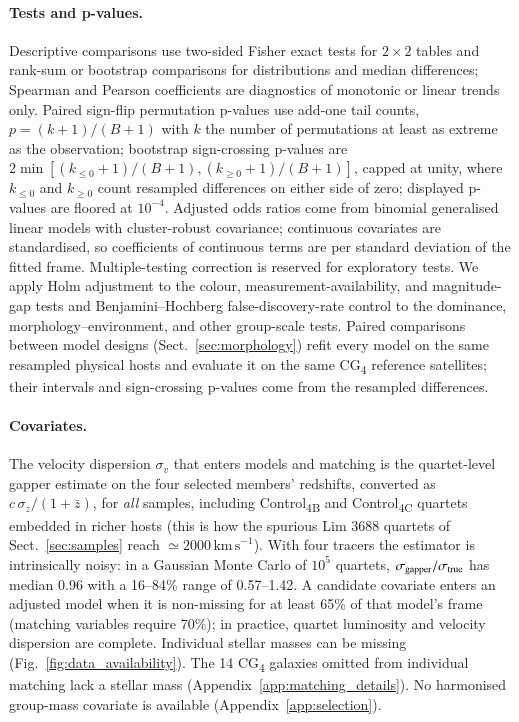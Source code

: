 \documentclass{aa}
\newcommand{\CB}{Control\textsubscript{4B}}
\newcommand{\CC}{Control\textsubscript{4C}}
\newcommand{\CG}{CG\textsubscript{4}}
\newcommand{\kms}{\,\mathrm{km\,s}^{-1}}
\begin{document}
\begin{appendix}
\paragraph{Tests and p-values.} Descriptive comparisons use two-sided Fisher exact tests for \(2\times2\) tables and rank-sum or bootstrap comparisons for distributions and median differences; Spearman and Pearson coefficients are diagnostics of monotonic or linear trends only. Paired sign-flip permutation p-values use add-one tail counts, \(p = (k+1)/(B+1)\) with \(k\) the number of permutations at least as extreme as the observation; bootstrap sign-crossing p-values are \(2\min[(k_{\le 0}+1)/(B+1),(k_{\ge 0}+1)/(B+1)]\), capped at unity, where \(k_{\le 0}\) and \(k_{\ge 0}\) count resampled differences on either side of zero; displayed p-values are floored at \(10^{-4}\). Adjusted odds ratios come from binomial generalised linear models with cluster-robust covariance; continuous covariates are standardised, so coefficients of continuous terms are per standard deviation of the fitted frame. Multiple-testing correction is reserved for exploratory tests. We apply Holm adjustment \citep{Holm1979} to the colour, measurement-availability, and magnitude-gap tests and Benjamini--Hochberg false-discovery-rate control \citep{BenjaminiHochberg1995} to the dominance, morphology--environment, and other group-scale tests. Paired comparisons between model designs (Sect.~\ref{sec:morphology}) refit every model on the same resampled physical hosts and evaluate it on the same \CG{} reference satellites; their intervals and sign-crossing p-values come from the resampled differences.


\paragraph{Covariates.} The velocity dispersion \(\sigma_v\) that enters models and matching is the quartet-level gapper estimate \citep{Wainer&Thissen76} on the four selected members' redshifts, converted as \(c\,\sigma_z/(1+\bar z)\), for \emph{all} samples, including \CB{} and \CC{} quartets embedded in richer hosts (this is how the spurious Lim 3688 quartets of Sect.~\ref{sec:samples} reach \({\simeq}2000\kms\)). With four tracers the estimator is intrinsically noisy: in a Gaussian Monte Carlo of \(10^5\) quartets, \(\sigma_{\rm gapper}/\sigma_{\rm true}\) has median 0.96 with a 16--84\% range of 0.57--1.42. A candidate covariate enters an adjusted model when it is non-missing for at least 65\% of that model's frame (matching variables require 70\%); in practice, quartet luminosity and velocity dispersion are complete. Individual stellar masses can be missing (Fig.~\ref{fig:data_availability}). The 14 \CG{} galaxies omitted from individual matching lack a stellar mass (Appendix~\ref{app:matching_details}). No harmonised group-mass covariate is available (Appendix~\ref{app:selection}).



\end{appendix}
\end{document}

